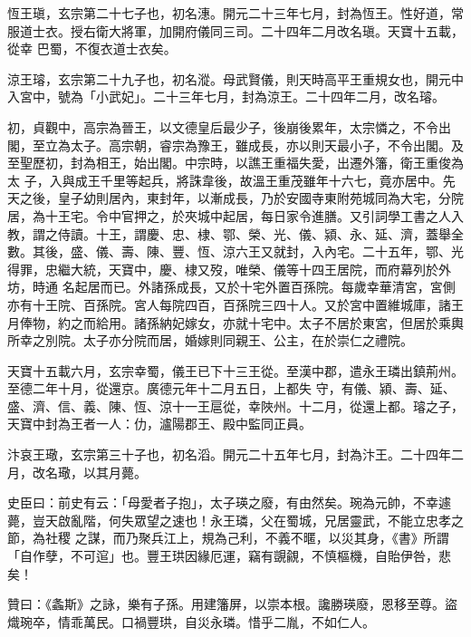 \begin{pinyinscope}
 恆王瑱，玄宗第二十七子也，初名潓。開元二十三年七月，封為恆王。性好道，常服道士衣。授右衛大將軍，加開府儀同三司。二十四年二月改名瑱。天寶十五載，從幸
 巴蜀，不復衣道士衣矣。



 涼王璿，玄宗第二十九子也，初名漎。母武賢儀，則天時高平王重規女也，開元中入宮中，號為「小武妃」。二十三年七月，封為涼王。二十四年二月，改名璿。



 初，貞觀中，高宗為晉王，以文德皇后最少子，後崩後累年，太宗憐之，不令出閣，至立為太子。高宗朝，睿宗為豫王，雖成長，亦以則天最小子，不令出閣。及至聖歷初，封為相王，始出閣。中宗時，以譙王重福失愛，出遷外籓，衛王重俊為太
 子，入與成王千里等起兵，將誅韋後，故溫王重茂雖年十六七，竟亦居中。先天之後，皇子幼則居內，東封年，以漸成長，乃於安國寺東附苑城同為大宅，分院居，為十王宅。令中官押之，於夾城中起居，每日家令進膳。又引詞學工書之人入教，謂之侍讀。十王，謂慶、忠、棣、鄂、榮、光、儀、潁、永、延、濟，蓋舉全數。其後，盛、儀、壽、陳、豐、恆、涼六王又就封，入內宅。二十五年，鄂、光得罪，忠繼大統，天寶中，慶、棣又歿，唯榮、儀等十四王居院，而府幕列於外坊，時通
 名起居而已。外諸孫成長，又於十宅外置百孫院。每歲幸華清宮，宮側亦有十王院、百孫院。宮人每院四百，百孫院三四十人。又於宮中置維城庫，諸王月俸物，約之而給用。諸孫納妃嫁女，亦就十宅中。太子不居於東宮，但居於乘輿所幸之別院。太子亦分院而居，婚嫁則同親王、公主，在於崇仁之禮院。



 天寶十五載六月，玄宗幸蜀，儀王已下十三王從。至漢中郡，遣永王璘出鎮荊州。至德二年十月，從還京。廣德元年十二月五日，上都失
 守，有儀、潁、壽、延、盛、濟、信、義、陳、恆、涼十一王扈從，幸陜州。十二月，從還上都。璿之子，天寶中封為王者一人：仂，瀘陽郡王、殿中監同正員。



 汴哀王璥，玄宗第三十子也，初名滔。開元二十五年七月，封為汴王。二十四年二月，改名璥，以其月薨。



 史臣曰：前史有云：「母愛者子抱」，太子瑛之廢，有由然矣。琬為元帥，不幸遽薨，豈天啟亂階，何失眾望之速也！永王璘，父在蜀城，兄居靈武，不能立忠孝之節，為社稷
 之謀，而乃聚兵江上，規為己利，不義不暱，以災其身，《書》所謂「自作孽，不可逭」也。豐王珙因緣厄運，竊有覬覦，不慎樞機，自貽伊咎，悲矣！



 贊曰：《螽斯》之詠，樂有子孫。用建籓屏，以崇本根。讒勝瑛廢，恩移至尊。盜熾琬卒，情乖萬民。口禍豐珙，自災永璘。惜乎二胤，不如仁人。



\end{pinyinscope}